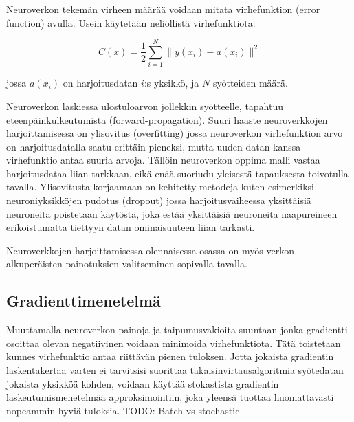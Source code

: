 \documentclass[finnish]{tktltiki2}
\theoremstyle{definition}
\theoremstyle{remark}
\begin{document}
  Neuroverkon tekemän virheen määrää voidaan mitata virhefunktion (error function) avulla. Usein käytetään neliöllistä virhefunktiota:

    $$C(x) = \frac{1}{2} \sum_{i=1}^{N} \| y(x_i)-a(x_i) \|^2$$

  jossa $a(x_i)$ on harjoitusdatan $i$:s yksikkö, ja $N$ syötteiden määrä.


  Neuroverkon laskiessa ulostuloarvon jollekkin syötteelle, tapahtuu eteenpäinkulkeutumista (forward-propagation). 
  Suuri haaste neuroverkkojen harjoittamisessa on ylisovitus (overfitting) jossa neuroverkon virhefunktion arvo on harjoitusdatalla saatu erittäin pieneksi, mutta uuden datan kanssa virhefunktio antaa suuria arvoja. Tällöin neuroverkon oppima malli vastaa harjoitusdataa liian tarkkaan, eikä enää suoriudu yleisestä tapauksesta toivotulla tavalla. Ylisovitusta korjaamaan on kehitetty metodeja kuten esimerkiksi neuroniyksikköjen pudotus (dropout) jossa harjoitusvaiheessa yksittäisiä neuroneita poistetaan käytöstä, joka estää yksittäisiä neuroneita naapureineen erikoistumatta tiettyyn datan ominaisuuteen liian tarkasti.

  Neuroverkkojen harjoittamisessa olennaisessa osassa on myös verkon alkuperäisten painotuksien valitseminen sopivalla tavalla.

  \subsection{Gradienttimenetelmä} %

  Muuttamalla neuroverkon painoja ja taipumusvakioita suuntaan jonka gradientti osoittaa olevan negatiivinen voidaan minimoida virhefunktiota. Tätä toistetaan kunnes virhefunktio antaa riittävän pienen tuloksen. Jotta jokaista gradientin laskentakertaa varten ei tarvitsisi suorittaa takaisinvirtausalgoritmia syötedatan jokaista yksikköä kohden, voidaan käyttää stokastista gradientin laskeutumismenetelmää approksimointiin, joka yleensä tuottaa huomattavasti nopeammin hyviä tuloksia. TODO: Batch vs stochastic.

\end{document}
